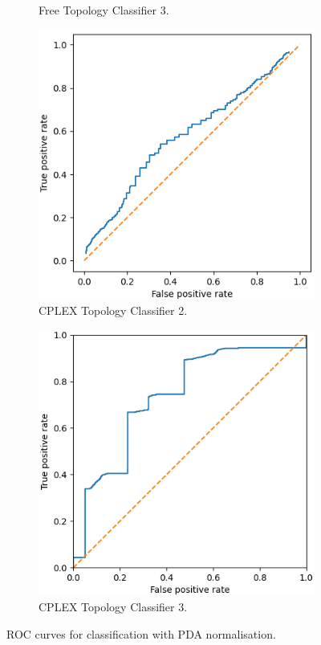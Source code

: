 \begin{figure}[H]
\begin{subfigure}[H]{0.475\textwidth}
        \caption{Free Topology Classifier 3.}
    \end{subfigure}
    \begin{subfigure}[H]{0.475\textwidth}
        \includegraphics[width=\textwidth]{figs/results/metric_normilisation/norway_ac2.png}
        \caption{CPLEX Topology Classifier 2.}
    \end{subfigure}
    \begin{subfigure}[H]{0.475\textwidth}
        \includegraphics[width=\textwidth]{figs/results/metric_normilisation/norway_ac3.png}
        \caption{CPLEX Topology Classifier 3.}
    \end{subfigure}
    \caption{ROC curves for classification with PDA normalisation.}
    \label{fig:RmetricnormROCcurves}
\end{figure}
